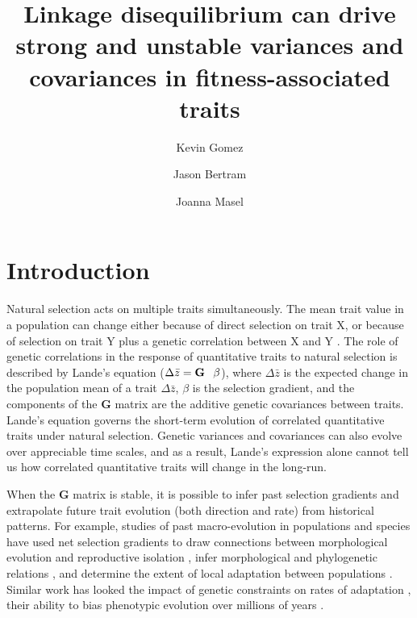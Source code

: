 \documentclass[9pt,twocolumn,twoside]{gsajnl}
\title{Linkage disequilibrium can drive strong and unstable variances and covariances in fitness-associated traits}
\author[$\ast$,1]{Kevin Gomez}
\author[$\dagger$]{Jason Bertram}
\author[$\dagger$]{Joanna Masel}
\affil[$\ast$]{Graduate Interdisciplinary Program in Applied Mathematics, University of Arizona, and}
\affil[$\dagger$]{Department of Evolution and Ecology, University of Arizona}
\newcommand{\G}{\textbf{G }}
\begin{document}
\maketitle
\thispagestyle{firststyle}
\marginmark
\firstpagefootnote
{}
\vspace{-11pt}%

\section{Introduction}

Natural selection acts on multiple traits simultaneously. The mean trait value in a population can change either because of direct selection on trait X, or because of selection on trait Y plus a genetic correlation between X and Y \citep{lande1979quantitative,lande1983measurement}. The role of genetic correlations in the response of quantitative traits to natural selection is described by Lande's equation ($\Delta \bar{z} = \G \hspace{.05in}\beta$), where $\Delta \bar{z}$ is the expected change in the population mean of a trait $\Delta \bar{z}$, $\beta$ is the selection gradient, and the components of the \G  matrix are the additive genetic covariances between traits. Lande's equation governs the short-term evolution of correlated quantitative traits under natural selection. Genetic variances and covariances can also evolve over appreciable time scales, and as a result, Lande's expression alone cannot tell us how correlated quantitative traits will change in the long-run. 

When the \G matrix is stable, it is possible to infer past selection gradients and extrapolate future trait evolution (both direction and rate) from historical patterns. For example, studies of past macro-evolution in populations and species have used net selection gradients to draw connections between morphological evolution and reproductive isolation \citep{price1984genetic}, infer morphological and phylogenetic relations \citep{schluter1984morphological}, and determine the extent of local adaptation between populations \citep{dudley1996}. Similar work has looked the impact of genetic constraints on rates of adaptation \citep{teplitsky2014assessing,teplitsky2011quantitative}, their ability to bias phenotypic evolution over millions of years \cite{Schluter1996}. 
\end{document}
